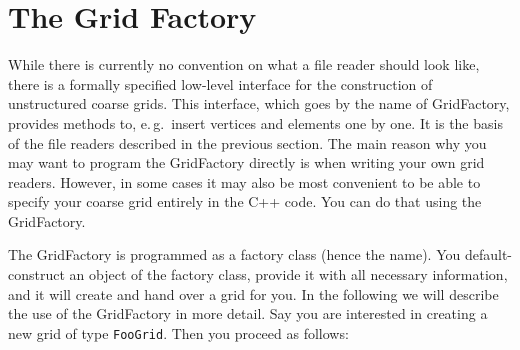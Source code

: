 \documentclass[11pt,a4paper,headinclude,footinclude,DIV16,normalheadings]{scrreprt}
\begin{document}
\section{The Grid Factory}
\label{sec:grid_factory}

While there is currently no convention on what a file reader should look like,
there is a formally specified low-level interface for the construction of
unstructured coarse grids.  This interface, which goes by the name of
GridFactory, provides methods to, e.\,g.~insert vertices and elements one by one.
It is the basis of the file readers described in the previous section.
The main reason why you may want to program the GridFactory directly is
when writing your own grid readers.  However, in some cases it may also be
most convenient to be able to specify your coarse grid entirely in the
C++ code.  You can do that using the GridFactory.

The GridFactory is programmed as a factory class (hence the name).
You default-construct an object of the factory class, provide it with all
necessary information, and it will create and hand over a grid for you.
In the following we will describe the use of the GridFactory in more detail.
Say you are interested in creating a new grid of type \lstinline!FooGrid!.  Then
you proceed as follows:
\end{document}
